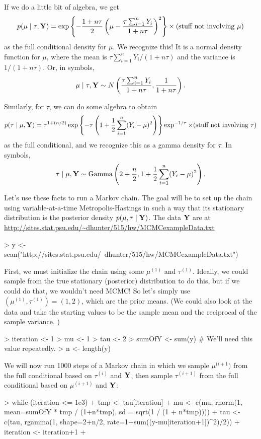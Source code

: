 \documentclass{article}
\def\vec#1{\mathchoice{\mbox{\boldmath$\displaystyle\bf#1$}}
{\mbox{\boldmath$\textstyle\bf#1$}}
{\mbox{\boldmath$\scriptstyle\bf#1$}}
{\mbox{\boldmath$\scriptscriptstyle\bf#1$}}}
\begin{document}
If we do a little bit of algebra, we get
\[
p(\mu \mid \tau, \vec Y) =
\exp \left\{ -\frac{ 1+ n\tau}{2} \left( \mu - \frac{\tau\sum_{i=1}^n Y_i}{1+n\tau} \right)^2 \right\}
\times (\mbox{stuff not involving $\mu$})
\]
as the full conditional density for $\mu$.  We recognize this!  It is a normal density function for 
$\mu$, where the mean is $\tau\sum_{i=1}^n Y_i/(1+n\tau)$ and the variance is
$1/(1+n\tau)$.  Or, in symbols,
\[
\mu \mid \tau, \vec Y \sim N \left( \frac{\tau\sum_{i=1}^n Y_i }{1+n\tau} ,
\frac{1}{1+n\tau} \right).
\]

Similarly, for $\tau$, we can do some algebra to obtain
\[
p(\tau \mid \mu, \vec Y) =
\tau^{1+(n/2)} 
\exp \left\{ -\tau \left( 1 + \frac12 \sum_{i=1}^n (Y_i - \mu)^2 \right) \right\} 
\exp^{-1/\tau}
\times (\mbox{stuff not involving $\tau$})
\]
as the full conditional, and we recognize this as a gamma density for $\tau$.  In symbols,
\[
\tau\mid \mu, \vec Y \sim \mbox{Gamma} \left( 
2+\frac n2,
1+\frac12\sum_{i=1}^n(Y_i - \mu)^2
\right).
\]

Let's use these facts to run a Markov chain.  
The goal will be to set up the chain using variable-at-a-time Metropolis-Hastings
in such a way that its stationary distribution is the posterior density $p(\mu, \tau \mid \vec Y)$.
The data $\vec Y$ are at 
\url{http://sites.stat.psu.edu/~dhunter/515/hw/MCMCexampleData.txt}
\begin{Schunk}
\begin{Sinput}
> y <- scan("http://sites.stat.psu.edu/~dhunter/515/hw/MCMCexampleData.txt")
\end{Sinput}
\end{Schunk}
First, we must initialize the chain using some $\mu^{(1)}$ and $\tau^{(1)}$.  Ideally, 
we could sample from the true stationary (posterior) distribution to do this, but if we
could do that, we wouldn't need MCMC!  So let's simply use $(\mu^{(1)}, \tau^{(1)}) =
(1,2)$, which are the prior means.  (We could also look at the data and take the starting values
to be the sample mean and the reciprocal of the sample variance. )
\begin{Schunk}
\begin{Sinput}
> iteration <- 1
> mu <- 1
> tau <- 2
> sumOfY <- sum(y) # We'll need this value repeatedly.
> n <- length(y)
\end{Sinput}
\end{Schunk}
We will now run 1000 steps of a Markov chain in which we sample $\mu^{(i+1})$ from
the full conditional based on $\tau^{(i)}$ and $\vec Y$, then sample $\tau^{(i+1)}$ from
the full conditional based on $\mu^{(i+1)}$ and $\vec Y$:
\begin{Schunk}
\begin{Sinput}
> while (iteration <= 1e3) {
+   tmp <- tau[iteration]
+   mu <- c(mu, rnorm(1, mean=sumOfY * tmp / (1+n*tmp), sd = sqrt(1 / (1 + n*tmp))))
+   tau <- c(tau, rgamma(1, shape=2+n/2, rate=1+sum((y-mu[iteration+1])^2)/2))
+   iteration <- iteration+1
+ }
\end{Sinput}
\end{Schunk}
\end{document}
